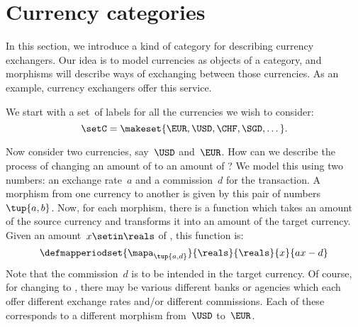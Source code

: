 
\section{Currency categories}
\label{sec:currency_cat}
In this section, we introduce a kind of category for describing currency exchangers.
Our idea is to model currencies as objects of a category, and morphisms will describe ways of exchanging between those currencies.
As an example, currency exchangers offer this service.

We start with a set~\setC of labels for all the currencies we wish to consider:
\begin{equation}
    \setC = \makeset{ \EUR, \USD, \CHF, \SGD, \dots }.
\end{equation}


Now consider two currencies, say~$\USD$ and~$\EUR$.
How can we describe the process of changing an amount of \USD to an amount of \EUR?
We model this using two numbers: an exchange rate~$a$ and a commission~$d$ for the transaction.
A morphism from one currency to another is given by this pair of numbers~$\tup{a,b}$.
Now, for each morphism, there is a function which takes an amount of the source currency and transforms it into an amount of the target currency.
Given an amount~$x \setin \reals$ of \USD, this function is:
\begin{equation}
    \label{eq:def_curr_ex}
    \defmapperiodset{\mapa_{\tup{a,d}}}{\reals}{\reals}{x}{ax-d}
\end{equation}
Note that the commission~$d$ is to be intended in the target currency.
Of course, for changing \USD to \EUR, there may be various different banks or agencies which each offer different exchange rates and/or different commissions.
Each of these corresponds to a different morphism from~$\USD$ to~$\EUR$.

